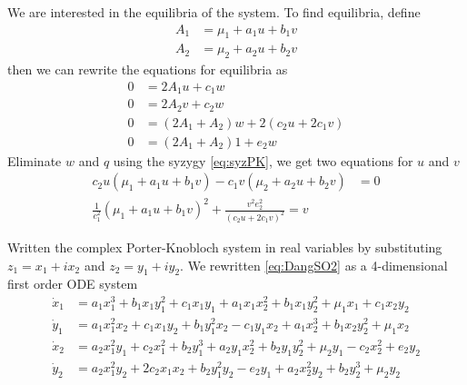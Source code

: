 \documentclass{article}
\begin{document}
We are interested in the equilibria of the system. To find equilibria, define
\begin{align}
A_1&=\mu_1+a_1u+b_1v\\
A_2&=\mu_2+a_2u+b_2v
\end{align}
then we can rewrite the equations for equilibria as
\begin{align}
0&=2A_1u+c_1w\\
0&=2A_2v+c_2w\\
0&=(2A_1+A_2)w+2(c_2u+2c_1v)\\
0&=(2A_1+A_2)1+e_2w
\end{align}
Eliminate $w$ and $q$ using the syzygy \ref{eq:syzPK}, we get two equations for $u$ and $v$
\begin{align}
c_2u(\mu_1+a_1u+b_1v)-c_1v(\mu_2+a_2u+b_2v)&=0\\
\frac{1}{c_1^2}(\mu_1+a_1u+b_1v)^2+\frac{v^2e_2^2}{(c_2u+2c_1v)^2}=v
\end{align}


Written the complex Porter-Knobloch system in real variables by substituting $z_1 = x_1 + i x_2$ and $z_2 = y_1 + i y_2$.
We rewritten \ref{eq:DangSO2} as a 4-dimensional first order ODE system			
			\begin{align}
				\dot{x}_1 &= a_1 x_1^3 + b_1 x_1 y_1^2 + c_1 x_1 y_1 + a_1 x_1 x_2^2 + b_1 x_1 y_2^2 + \mu_1 x_1 + c_1 x_2 y_2\\
				\dot{y}_1 &= a_1 x_1^2 x_2 + c_1 x_1 y_2 + b_1 y_1^2 x_2 - c_1 y_1 x_2 + a_1 x_2^3 + b_1 x_2 y_2^2 + \mu_1 x_2\\
				\dot{x}_2 &= a_2 x_1^2 y_1 + c_2 x_1^2 + b_2 y_1^3 + a_2 y_1 x_2^2 + b_2 y_1 y_2^2 + \mu_2 y_1 - c_2 x_2^2 + e_2 y_2\\
				\dot{y}_2 &= a_2 x_1^2 y_2 + 2 c_2 x_1 x_2 + b_2 y_1^2 y_2 - e_2 y_1 + a_2 x_2^2 y_2 + b_2 y_2^3 + \mu_2 y_2
			\end{align}
\end{document}
